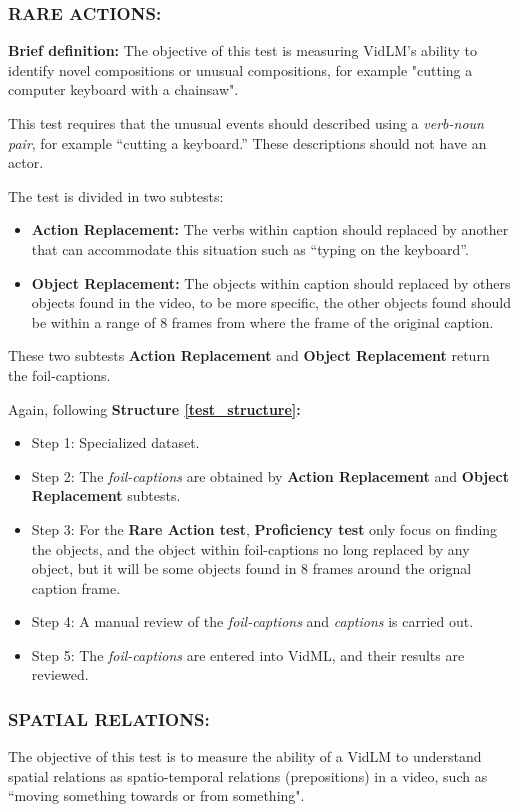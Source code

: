 \subsubsection{RARE ACTIONS:}
\textbf{Brief definition:}
The objective of this test is measuring VidLM's ability to identify novel compositions or unusual compositions, for example "cutting a computer keyboard with a chainsaw".

This test requires that the unusual events should described using a \textit{verb-noun pair}, for example “cutting a keyboard.” These descriptions should not have an actor.

The test is divided in two subtests:
\begin{itemize}
\item \textbf{Action Replacement:} The verbs within caption should replaced by another that can accommodate this situation such as “typing on the keyboard”.
\item \textbf{Object Replacement:} The objects within caption should replaced by others objects found in the video,  to be more specific, the other objects found should be within a range of 8 frames from where the frame of the original caption.
\end{itemize}
These two subtests \textbf{Action Replacement} and \textbf{Object Replacement} return the foil-captions.

Again, following \textbf{Structure \ref{test_structure}:}
\begin{itemize}
\item Step 1: Specialized dataset.
\item Step 2: The \textit{foil-captions} are obtained by \textbf{Action Replacement} and \textbf{Object Replacement} subtests.
\item Step 3: For the \textbf{Rare Action test}, \textbf{Proficiency test} only focus on finding the objects, and the object within foil-captions no long replaced by any object, but it will be some objects found in 8 frames around the orignal caption frame.
\item Step 4: A manual review of the \textit{foil-captions} and \textit{captions} is carried out.
\item Step 5: The \textit{foil-captions} are entered into VidML, and their results are reviewed.
\end{itemize}

\subsubsection{SPATIAL RELATIONS:}
The objective of this test is to measure the ability of a VidLM to understand spatial relations as spatio-temporal relations (prepositions) in a video, such as ``moving something towards or from something".

